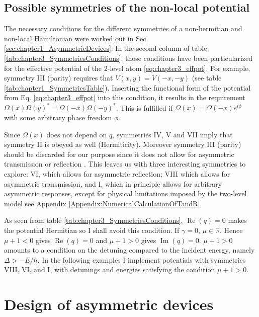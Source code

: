 \subsection{Possible symmetries of the non-local potential}
%
The necessary conditions for the different symmetries of a non-hermitian and non-local Hamiltonian were worked out in Sec. \ref{sec:chapter1_AsymmetricDevices}. In the second column of table \ref{tab:chapter3_SymmetriesConditions}, those conditions have been particularized for the effective potential of the 2-level atom \eqref{eq:chapter3_effpot}. For example, symmetry III (parity) requires that $V(x,y)=V(-x,-y)$ (see table \ref{tab:chapter1_SymmetriesTable}). Inserting the functional form of the potential from Eq. \eqref{eq:chapter3_effpot} into this condition, it results in the requirement $\Omega(x) \Omega(y)^* = \Omega(-x) \Omega(-y)^*$. This is fulfilled if $\Omega(x)=\Omega(-x)e^{i \phi}$ with some arbitrary phase freedom $\phi$.

Since $\Omega(x)$ does not depend on $q$, symmetries IV, V and VII imply that symmetry II is obeyed as well (Hermiticity).
Moreover symmetry III (parity) should be discarded for our purpose since it does not allow for asymmetric transmission or reflection
\cite{Ruschhaupt2017}.
This leaves us with three interesting symmetries to explore:
VI, which allows for  asymmetric reflection; VIII which allows for asymmetric transmission, and  I,
which in principle allows for arbitrary asymmetric responses, except for physical limitations imposed by
the two-level model see Appendix \ref{Appendix:NumericalCalculationOfTandR}.

As seen from  table \ref{tab:chapter3_SymmetriesConditions}, $\operatorname{Re}(q)=0$ makes the potential Hermitian so I shall avoid this condition.
If $\gamma=0$,   $\mu \in \mathbb{R}$. Hence $\mu+1<0$ gives $\operatorname{Re}(q)=0$ and $\mu+1>0$ gives
$\operatorname{Im}(q)=0$. $\mu+1>0$ amounts to a condition on the detuning compared to the incident energy, namely $\Delta>-E/\hbar$.
In the following examples I implement potentials with symmetries VIII, VI, and I, with detunings and energies satisfying the condition $\mu+1>0$.


\section{Design of asymmetric devices\label{exa}}

